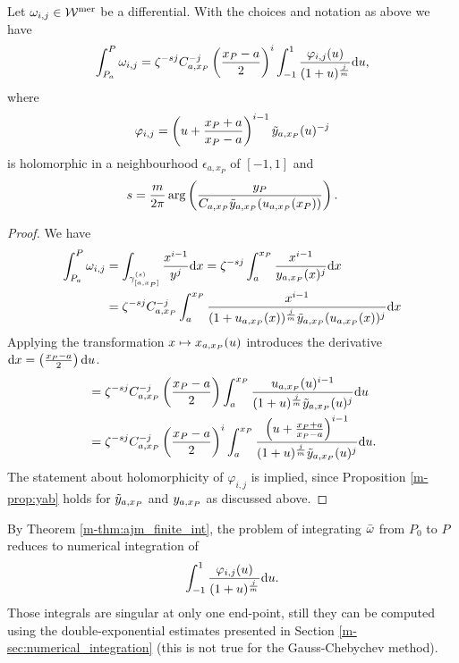 \documentclass[main.tex]{subfiles}
\begin{document}
  \begin{thm}\label{thm:ajm_finite_int}
  Let $\omega_{i,j} \in \mathcal{W}^{\text{mer}}$ be a differential. With the choices and notation as above we have
 \begin{equation}\label{eq:aj_int}
       \int_{P_a}^P \omega_{i,j} = \zeta^{-sj} C_{a,x_P}^{-j} \left(\frac{x_P-a}{2}\right)^i \int_{-1}^1 \frac{\varphi_{i,j}(u)}{(1+u)^{\frac{j}{m}}}  \mathrm d u,
  \end{equation}
   where
   \begin{equation*}
    \varphi_{i,j}  = \left(u+\frac{x_P+a}{x_P-a}\right)^{i-1} \tilde{y}_{a,x_P}(u)^{-j}
   \end{equation*}
   is holomorphic in a neighbourhood $\epsilon_{a,x_P}$ of $[-1,1]$
   and
   \begin{equation}
   s = \frac{m}{2\pi} \arg\left(  \frac{y_P}{C_{a,x_P} \tilde{y}_{a,x_P}( u_{a,x_P}(x_P) )} \right).
   \end{equation}
  \end{thm}
  \begin{proof}
    We have
    \begin{align*}
     \int_{P_a}^P \omega_{i,j}  & =  \int_{\gamma^{(s)}_{[a,x_P]}} \frac{x^{i-1}}{y^j}  \mathrm d x  =  \zeta^{-sj} \int_a^{x_P} \frac{x^{i-1}}{y_{a,x_P}(x)^j}  \mathrm d x \\  & = 
     \zeta^{-sj} C_{a,x_P}^{-j}  \int_a^{x_P} \frac{x^{i-1}}{(1+u_{a,x_P}(x))^{\frac{j}{m}}\tilde{y}_{a,x_P}(u_{a,x_P}(x))^j}  \mathrm d x
  \end{align*}
   Applying the transformation $x \mapsto x_{a,x_P}(u)$ introduces the derivative $\mathrm d x = \left(\frac{x_P-a}{2}\right) \mathrm d u$.
  \begin{align*}
   & =  \zeta^{-sj} C_{a,x_P}^{-j} \left(\frac{x_P-a}{2}\right) \int_a^{x_P} \frac{u_{a,x_P}(u)^{i-1}}{(1+u)^{\frac{j}{m}}\tilde{y}_{a,x_P}(u)^j}  \mathrm d u \\ & =
   \zeta^{-sj} C_{a,x_P}^{-j} \left(\frac{x_P-a}{2}\right)^i \int_a^{x_P} \frac{\left(u + \frac{x_P+a}{x_P-a}\right)^{i-1}}{(1+u)^{\frac{j}{m}}\tilde{y}_{a,x_P}(u)^j}  \mathrm d u.
  \end{align*}
  The statement about holomorphicity of $\varphi_{i,j}$ is implied, since
  Proposition \ref{m-prop:yab} holds for $\tilde{y}_{a,x_P}$ and $y_{a,x_P}$ as discussed
  above.
  \end{proof}

  \begin{rmk}\label{rmk:ajm_finite_int}
   By Theorem \ref{m-thm:ajm_finite_int}, the problem of integrating $\bar{\omega}$ from $P_0$ to $P$ reduces to numerical integration of
    \begin{equation*}
       \int_{-1}^1 \frac{\varphi_{i,j}(u)}{(1+u)^{\frac{j}{m}}}  \mathrm d u.
   \end{equation*}
   Those integrals are singular at only one end-point, still they
   can be computed using the double-exponential estimates presented in Section
   \ref{m-sec:numerical_integration} (this is not true for the Gauss-Chebychev method).
   \end{rmk}
\end{document}
